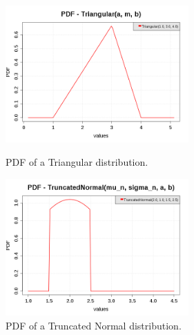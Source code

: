 \begin{figure}[H]
  \begin{minipage}{10cm}
    \begin{center}
      \includegraphics[width=7cm]{pdf_Triangular.png}
      \caption{PDF of a  Triangular distribution.}
      \label{PDFTriangular}
    \end{center}
  \end{minipage}
  \hfill
  \begin{minipage}{10cm}
    \begin{center}
      \includegraphics[width=7cm]{pdf_TruncatedNormal_1.png}
      \caption{PDF of a  Truncated Normal distribution.}
      \label{PDFTruncatedNormal1}
    \end{center}
  \end{minipage}
\end{figure}

